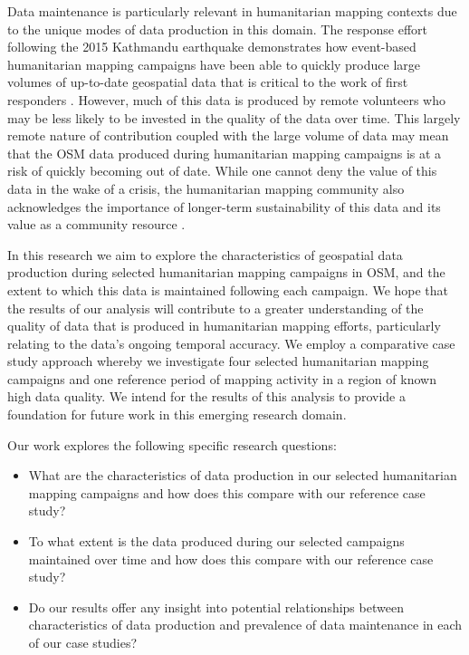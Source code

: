 Data maintenance is particularly relevant in humanitarian mapping contexts due to the unique modes of data production in this domain. The response effort following the 2015 Kathmandu earthquake demonstrates how event-based humanitarian mapping campaigns have been able to quickly produce large volumes of up-to-date geospatial data that is critical to the work of first responders \parencite{soden_infrastructure_2016}. However, much of this data is produced by remote volunteers \parencite{eckle_quality_2015} who may be less likely to be invested in the quality of the data over time. This largely remote nature of contribution coupled with the large volume of data may mean that the OSM data produced during humanitarian mapping campaigns is at a risk of quickly becoming out of date. While one cannot deny the value of this data in the wake of a crisis, the humanitarian mapping community also acknowledges the importance of longer-term sustainability of this data and its value as a community resource \parencite{soden_crowdsourced_2014}. 

In this research we aim to explore the characteristics of geospatial data production during selected humanitarian mapping campaigns in OSM, and the extent to which this data is maintained following each campaign. We hope that the results of our analysis will contribute to a greater understanding of the quality of data that is produced in humanitarian mapping efforts, particularly relating to the data’s ongoing temporal accuracy. We employ a comparative case study approach whereby we investigate four selected humanitarian mapping campaigns and one reference period of mapping activity in a region of known high data quality. We intend for the results of this analysis to provide a foundation for future work in this emerging research domain. 

Our work explores the following specific research questions: 

\begin{itemize}
    \item What are the characteristics of data production in our selected humanitarian mapping campaigns and how does this compare with our reference case study?
    \item To what extent is the data produced during our selected campaigns maintained over time and how does this compare with our reference case study? 
    \item Do our results offer any insight into potential relationships between characteristics of data production and prevalence of data maintenance in each of our case studies? 
\end{itemize}

